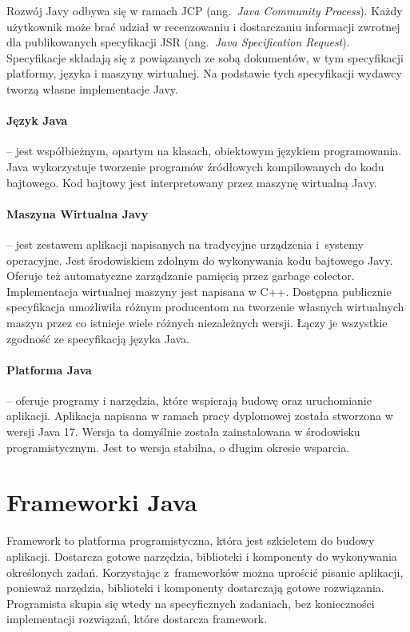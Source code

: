 Rozwój Javy odbywa się w ramach JCP (ang.~\emph{Java Community Process}). Każdy użytkownik może brać udział w recenzowaniu i dostarczaniu informacji zwrotnej dla publikowanych specyfikacji JSR (ang.~\emph{Java Specification Request}). Specyfikacje składają się z powiązanych ze sobą dokumentów, w tym specyfikacji platformy, języka i  maszyny wirtualnej. Na podstawie tych specyfikacji wydawcy tworzą własne implementacje Javy.

\paragraph{Język Java} -- jest współbieżnym, opartym na klasach, obiektowym językiem programowania. Java wykorzystuje tworzenie programów źródłowych kompilowanych do kodu bajtowego. Kod bajtowy jest interpretowany przez maszynę wirtualną Javy. 

\paragraph{Maszyna Wirtualna Javy} -- jest zestawem aplikacji napisanych na tradycyjne urządzenia i~systemy operacyjne. Jest środowiskiem  zdolnym do wykonywania kodu bajtowego Javy. Oferuje też automatyczne zarządzanie pamięcią przez garbage colector. Implementacja wirtualnej maszyny jest napisana w C++. Dostępna publicznie specyfikacja umożliwiła różnym producentom na tworzenie własnych wirtualnych maszyn przez co istnieje wiele różnych niezależnych wersji. Łączy je wszystkie zgodność ze specyfikacją języka Java.

\paragraph{Platforma Java} -- oferuje programy i narzędzia, które wspierają budowę oraz uruchomianie aplikacji. Aplikacja napisana w ramach pracy dyplomowej została stworzona w wersji Java 17. Wersja ta domyślnie została zainstalowana w środowisku programistycznym. Jest to wersja stabilna, o długim okresie wsparcia.

\section{Frameworki Java}
Framework to platforma programistyczna, która jest szkieletem do budowy aplikacji. Dostarcza gotowe narzędzia, biblioteki i komponenty do wykonywania określonych zadań. Korzystając z~frameworków można uprościć pisanie aplikacji, ponieważ narzędzia, biblioteki i komponenty dostarczają gotowe rozwiązania. Programista skupia się wtedy na specyficznych zadaniach, bez konieczności implementacji rozwiązań, które dostarcza framework. 


